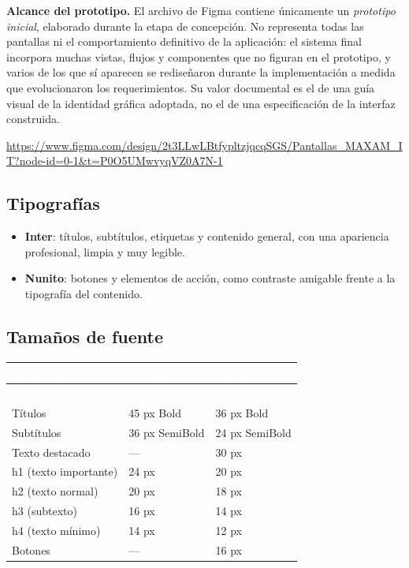 \documentclass[11pt,letterpaper]{article}
\newcommand{\cabecera}{\rowcolor{maxamPrimario}}
\newcommand{\tth}[1]{\textcolor{white}{\textbf{#1}}}
\begin{document}
\begin{nota}
\textbf{Alcance del prototipo.} El archivo de Figma contiene únicamente un \emph{prototipo inicial}, elaborado durante la etapa de concepción. No representa todas las pantallas ni el comportamiento definitivo de la aplicación: el sistema final incorpora muchas vistas, flujos y componentes que no figuran en el prototipo, y varios de los que sí aparecen se rediseñaron durante la implementación a medida que evolucionaron los requerimientos. Su valor documental es el de una guía visual de la identidad gráfica adoptada, no el de una especificación de la interfaz construida.
\end{nota}

\begin{center}
\url{https://www.figma.com/design/2t3LLwLBtfypltzjqcqSGS/Pantallas_MAXAM_IT?node-id=0-1&t=P0O5UMwvyqVZ0A7N-1}
\end{center}

\subsection{Tipografías}
\begin{itemize}
  \item \textbf{Inter}: títulos, subtítulos, etiquetas y contenido general, con una apariencia profesional, limpia y muy legible.
  \item \textbf{Nunito}: botones y elementos de acción, como contraste amigable frente a la tipografía del contenido.
\end{itemize}

\subsection{Tamaños de fuente}
\begin{xltabular}{\textwidth}{L{5cm} L{4cm} Y}
\cabecera \tth{Elemento} & \tth{Escritorio} & \tth{Móvil} \\
\endfirsthead
\cabecera \tth{Elemento} & \tth{Escritorio} & \tth{Móvil} \\
\endhead
{} Títulos & 45 px Bold & 36 px Bold \\
Subtítulos & 36 px SemiBold & 24 px SemiBold \\
 Texto destacado & --- & 30 px \\
h1 (texto importante) & 24 px & 20 px \\
 h2 (texto normal) & 20 px & 18 px \\
h3 (subtexto) & 16 px & 14 px \\
 h4 (texto mínimo) & 14 px & 12 px \\
Botones & --- & 16 px \\
\end{xltabular}
\end{document}
